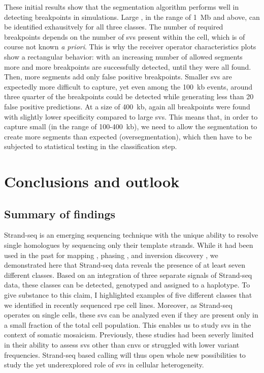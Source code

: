 These initial results show that the segmentation algorithm performs well in
detecting \sv breakpoints in simulations. Large \sv, in the range of 1~Mb and
above, can be identified exhausitvely for all three \sv classes. The number of
required breakpoints depends on the number of \acp{sv} present within the cell,
which is of course not known \emph{a priori}. This is why the receiver operator
characteristics plots show a rectangular behavior: with an increasing number of
allowed segments more and more \sv breakpoints are successfully detected, until
they were all found. Then, more segments add only false positive breakpoints.
Smaller \acp{sv} are expectedly more difficult to capture, yet even among the
100~kb events, around three quarter of the breakpoints could be detected while
generating less than 20 false positive predictions. At a size of 400~kb, again all
breakpoints were found with slightly lower specificity compared to large
\acp{sv}. This means that, in order to capture small \sv (in the range of
100-400~kb), we need to allow the segmentation to create more segments than
expected (oversegmentation), which then have to be subjected to statistical
testing in the classification step.





\section{Conclusions and outlook}
\label{sec:mosaic_conclusion}


\subsection{Summary of findings}

Strand-seq is an emerging sequencing technique with the unique ability to
resolve single homologues by sequencing only their template strands. While it
had been used in the past for \sce mapping \citep{Falconer2012}, phasing
\citep{Porubsky2016}, and inversion discovery \citep{Sanders2017}, we
demonstrated here that Strand-seq data reveals the presence of at least seven
different \sv classes. Based on an integration of three separate signals of
Strand-seq data, these \sv classes can be detected, genotyped and assigned to a
haplotype. To give substance to this claim, I highlighted examples of five
different \sv classes that we identified in recently sequenced \acf{rpe} cell lines.
Moreover, as Strand-seq operates on single cells, these \acp{sv} can be analyzed
even if they are present only in a small fraction of the total cell population.
This enables us to study \acp{sv} in the context of somatic mosaicism.
Previously, these studies had been severly limited in their ability to assess
\acp{sv} other than \acp{cnv} or struggled with lower variant frequencies.
Strand-seq based \sv calling will thus open whole new possibilities to study
the yet underexplored role of \acp{sv} in cellular heterogeneity.


